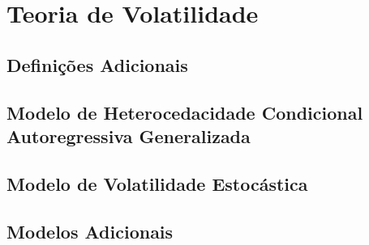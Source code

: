 \chapter{Teoria de Volatilidade}
\label{sec:volatility_theory}

\section{Definições Adicionais}

\section{Modelo de Heterocedacidade Condicional Autoregressiva Generalizada}
\label{sec:garch}

\section{Modelo de Volatilidade Estocástica}

\section{Modelos Adicionais}
